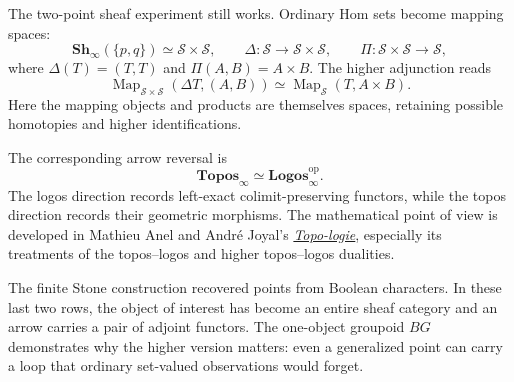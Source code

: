 The two-point sheaf experiment still works. Ordinary Hom sets become mapping spaces:
\[
 \mathbf{Sh}_{\infty}(\{p,q\})\simeq\mathcal S\times\mathcal S,
 \qquad
 \Delta:\mathcal S\longrightarrow\mathcal S\times\mathcal S,
 \qquad
 \Pi:\mathcal S\times\mathcal S\longrightarrow\mathcal S,
\]
where $\Delta(T)=(T,T)$ and $\Pi(A,B)=A\times B$. The higher adjunction reads
\[
 \boxed{
 \operatorname{Map}_{\mathcal S\times\mathcal S}
   (\Delta T,(A,B))
 \simeq
 \operatorname{Map}_{\mathcal S}(T,A\times B).}
\]
Here the mapping objects and products are themselves spaces, retaining possible homotopies and higher identifications.

The corresponding arrow reversal is
\[
 \boxed{\mathbf{Topos}_{\infty}
          \simeq\mathbf{Logos}_{\infty}^{\mathrm{op}}.}
\]
The logos direction records left-exact colimit-preserving functors, while the topos direction records their geometric morphisms. The mathematical point of view is developed in Mathieu Anel and Andr\'e Joyal's \href{https://doi.org/10.1017/9781108854429.007}{\emph{Topo-logie}}, especially its treatments of the topos--logos and higher topos--logos dualities.

The finite Stone construction recovered points from Boolean characters. In these last two rows, the object of interest has become an entire sheaf category and an arrow carries a pair of adjoint functors. The one-object groupoid $BG$ demonstrates why the higher version matters: even a generalized point can carry a loop that ordinary set-valued observations would forget.

